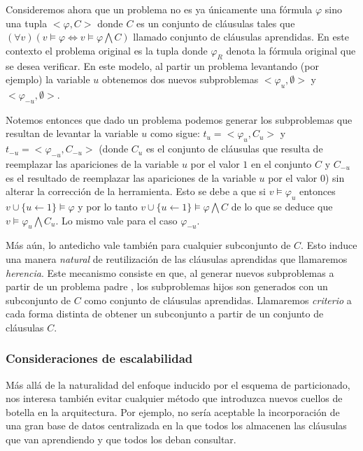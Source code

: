 Consideremos ahora que un problema no es ya únicamente una fórmula $\varphi$
sino una tupla $<\varphi, C>$ donde $C$ es un conjunto de cláusulas tales que
$(\forall v) (v \models \varphi \Longleftrightarrow v \models \varphi
\bigwedge C)$ llamado conjunto de cláusulas aprendidas. En este contexto el
problema original es la tupla \roottask donde $\varphi_R$ denota la fórmula
original que se desea verificar. En este modelo, al partir un problema \task
levantando (por ejemplo) la variable $u$ obtenemos dos nuevos subproblemas
$<\varphi_u, \emptyset>$ y $<\varphi_{-u}, \emptyset>$. 

Notemos entonces que dado un problema \nonemptytask podemos generar los
subproblemas que resultan de levantar la variable $u$ como sigue:
$t_u=<\varphi_u, C_u>$ y $t_{-u}=<\varphi_{-u}, C_{-u}>$ (donde $C_u$ es el
conjunto de cláusulas que resulta de reemplazar las apariciones de la variable
$u$ por el valor $1$ en el conjunto $C$ y $C_{-u}$ es el resultado de
reemplazar las apariciones de la variable $u$ por el valor $0$) sin alterar la
corrección de la herramienta. Esto se debe a que si $v \models \varphi_u$
entonces $v\cup\{u\leftarrow1\} \models \varphi$ y por lo tanto
$v\cup\{u\leftarrow1\} \models \varphi \bigwedge C$ de lo que se deduce que $v
\models \varphi_u \bigwedge C_u$. Lo mismo vale para el caso $\varphi_{-u}$.

Más aún, lo antedicho vale también para cualquier subconjunto de $C$. Esto
induce una manera \emph{natural} de reutilización de las cláusulas aprendidas
que llamaremos \emph{herencia}. Este mecanismo consiste en que, al generar
nuevos subproblemas a partir de un problema padre \nonemptytask, los
subproblemas hijos son generados con un subconjunto de $C$ como conjunto de
cláusulas aprendidas. Llamaremos \emph{criterio} a cada forma distinta de
obtener un subconjunto a partir de un conjunto de cláusulas $C$.


\subsubsection{Consideraciones de escalabilidad}

Más allá de la naturalidad del enfoque inducido por el esquema de
particionado, nos interesa también evitar cualquier método que introduzca
nuevos cuellos de botella en la arquitectura. Por ejemplo, no sería aceptable
la incorporación de una gran base de datos centralizada en la que todos los
\ws almacenen las cláusulas que van aprendiendo y que todos los \ws deban
consultar.

